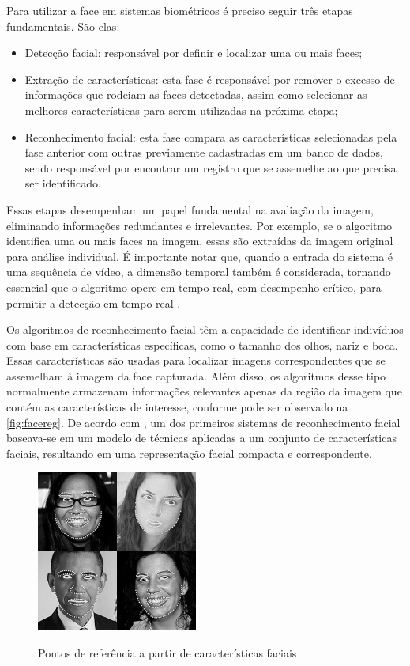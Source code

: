 Para utilizar a face em sistemas biométricos é preciso seguir três
etapas fundamentais. São elas:

\begin{itemize}
    \item Detecção facial: responsável por definir e localizar uma ou mais
    faces;

    \item Extração de características: esta fase é responsável por remover o excesso de
    informações que rodeiam as faces detectadas, assim como selecionar as melhores
    características para serem utilizadas na próxima etapa;

    \item Reconhecimento facial: esta fase compara as características selecionadas pela fase
    anterior com outras previamente cadastradas em um banco de dados, sendo
    responsável por encontrar um registro que se assemelhe ao que precisa ser
    identificado.

\end{itemize}

Essas etapas desempenham um papel fundamental na avaliação da imagem, eliminando informações 
redundantes e irrelevantes. Por exemplo, se o algoritmo identifica uma ou mais faces na 
imagem, essas são extraídas da imagem original para análise individual. É importante 
notar que, quando a entrada do sistema é uma sequência de vídeo, a dimensão temporal 
também é considerada, tornando essencial que o algoritmo opere em tempo real, com 
desempenho crítico, para permitir a detecção em tempo real \cite{boechat2008}. 

Os algoritmos de reconhecimento facial têm a capacidade de identificar indivíduos com 
base em características específicas, como o tamanho dos olhos, nariz e boca. Essas 
características são usadas para localizar imagens correspondentes que se assemelham 
à imagem da face capturada. Além disso, os algoritmos desse tipo normalmente armazenam 
informações relevantes apenas da região da imagem que contém as características de 
interesse, conforme pode ser observado na \autoref{fig:facereg}. De acordo 
com \cite{brunelli1993}, um dos primeiros sistemas de reconhecimento 
facial baseava-se em um modelo de técnicas aplicadas a um conjunto de características 
faciais, resultando em uma representação facial compacta e correspondente.

\begin{figure}[h!]
    \centering
    \caption{Pontos de referência a partir de características faciais}
    \includegraphics[scale=0.9]{figuras/facereg.jpg}
    \label{fig:facereg}
    \centering
\end{figure}

